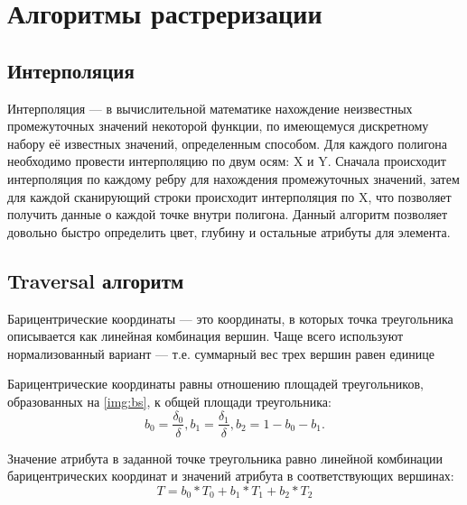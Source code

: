 \section{Алгоритмы растреризации}
\subsection{Интерполяция}
Интерполяция \cite{cg} --- в вычислительной математике нахождение неизвестных промежуточных значений некоторой функции, по имеющемуся дискретному набору её известных значений, определенным способом. Для каждого полигона необходимо провести интерполяцию по двум осям: X и Y. Сначала происходит интерполяция по каждому ребру для нахождения промежуточных значений, затем для каждой сканирующий строки происходит интерполяция по X, что позволяет получить данные о каждой точке внутри полигона. Данный алгоритм позволяет довольно быстро определить цвет, глубину и остальные атрибуты для элемента. 
\subsection{Traversal алгоритм}
Барицентрические координаты --- это координаты, в которых точка
треугольника описывается как линейная комбинация вершин. Чаще всего используют нормализованный вариант
--- т.е. суммарный вес трех вершин равен единице

Барицентрические координаты равны отношению площадей треугольников, образованных на \ref{img:bs}, к общей площади треугольника:
\begin{equation}
	b_{0} = \frac{\delta_{0}}{\delta},
	b_{1} = \frac{\delta_{1}}{\delta},
		b_{2} = 1 - b_{0} - b_{1}.
\end{equation}

\begin{center}
	\label{img:bs}
\end{center}
Значение атрибута в заданной точке треугольника равно линейной комбинации барицентрических координат и значений атрибута в соответствующих вершинах:
\begin{equation}
	T = b_{0}*T_{0} + b_{1}*T_{1} + b_{2}*T_{2}
\end{equation}

